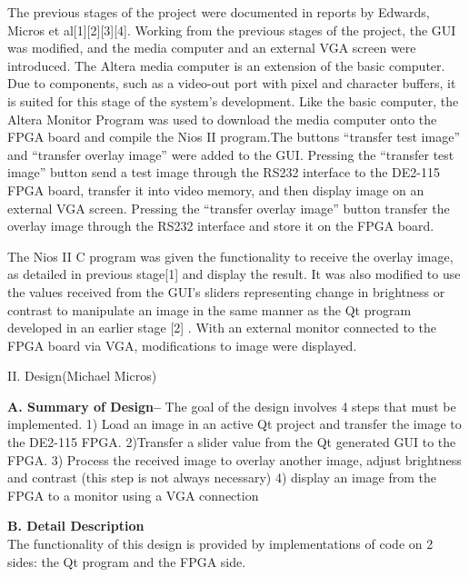 \documentclass{article}
\begin{document}
\begin{multicols*}{2}
     The previous stages of the project were documented in reports by Edwards, Micros et al[1][2][3][4]. Working from the previous stages of the project, the GUI was modified, and the media computer and an external VGA screen were introduced. The Altera media computer is an extension of the basic computer. Due to components, such as a video-out port with pixel and character buffers, it is suited for this stage of the system’s development. Like the basic computer, the Altera Monitor Program was used to download the media computer onto the FPGA board and compile the Nios II program.The buttons “transfer test image” and “transfer overlay image” were added to the GUI. Pressing the “transfer test image” button send a test image through the RS232 interface to the DE2-115 FPGA board, transfer it into video memory, and then display image on an external VGA screen. Pressing the “transfer overlay image” button transfer the overlay image through the RS232 interface and store it on the FPGA board.

    The Nios II C program was given the functionality to receive the overlay image, as detailed in previous stage[1] and display the result. It was also modified to use the values received from the GUI’s sliders representing change in brightness or contrast to manipulate an image in the same manner as the Qt program developed in an earlier stage [2] . With an external monitor connected to the FPGA board via VGA, modifications to image were displayed. 

\begin{center}
\large{II. Design(Michael Micros)}
\end{center}

{\bf A. Summary of Design--}  
The goal of the design involves 4 steps that must be implemented. 1) Load an image in an active Qt project and transfer the image to the DE2-115 FPGA. 2)Transfer a slider value from the Qt generated GUI to the FPGA. 3) Process the received image to overlay another image, adjust brightness and contrast (this step is not always necessary) 4) display an image from the FPGA to a monitor using a VGA connection


{\bf B. Detail Description}\\
The functionality of this design is provided by implementations of code on 2 sides: the Qt program and the FPGA side.


\end{multicols*}
\end{document}

